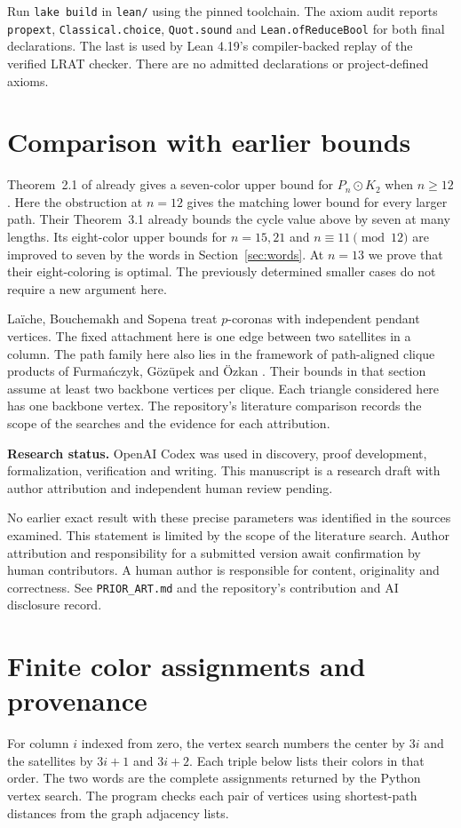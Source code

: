 \documentclass[11pt]{article}
\begin{document}
Run \texttt{lake build} in \texttt{lean/} using the pinned toolchain.
The axiom audit reports \texttt{propext}, \texttt{Classical.choice},
\texttt{Quot.sound} and \texttt{Lean.ofReduceBool} for both final
declarations. The last is used by Lean 4.19's compiler-backed
replay of the verified LRAT checker.
There are no admitted declarations or project-defined axioms.

\section{Comparison with earlier bounds}
\label{sec:prior}
Theorem~2.1 of \cite{ssu} already gives a seven-color upper bound for
\(P_n\odot K_2\) when \(n\ge12\). Here the obstruction at \(n=12\) gives
the matching lower bound for every larger path. Their Theorem~3.1
already bounds the cycle value above by seven at many lengths. Its
eight-color upper bounds for \(n=15,21\) and \(n\equiv11\pmod{12}\) are
improved to seven by the words in Section~\ref{sec:words}. At \(n=13\)
we prove that their eight-coloring is optimal. The previously determined
smaller cases do not require a new argument here.

La\"iche, Bouchemakh and Sopena \cite{lbs} treat \(p\)-coronas with
independent pendant vertices. The fixed attachment here is one edge
between two satellites in a column. The path family here also lies in the framework of
path-aligned clique products of Furma\'nczyk, G\"oz\"upek and
\"Ozkan \cite[Section 3.2]{fgo}. Their bounds in that section assume at least
two backbone vertices per clique. Each triangle considered here has one
backbone vertex. The repository's literature comparison records the
scope of the searches and the evidence for each attribution.

\medskip\noindent
\textbf{Research status.}
OpenAI Codex was used in discovery, proof development, formalization,
verification and writing. This manuscript is a research draft with
author attribution and independent human review pending.

No earlier exact result with these precise parameters was identified
in the sources examined. This statement is limited by the scope of
the literature search. Author attribution and responsibility for a
submitted version await confirmation by human contributors. A human
author is responsible for content, originality and correctness. See
\texttt{PRIOR\_ART.md} and the repository's contribution and AI
disclosure record.

\appendix
\section{Finite color assignments and provenance}
\label{app:assignments}
For column \(i\) indexed from zero, the vertex search numbers the
center by \(3i\) and the satellites by \(3i+1\) and \(3i+2\).
Each triple below lists their colors in that order. The two words
are the complete assignments returned by the Python vertex search.
The program checks each pair of vertices using shortest-path
distances from the graph adjacency lists.
\end{document}
